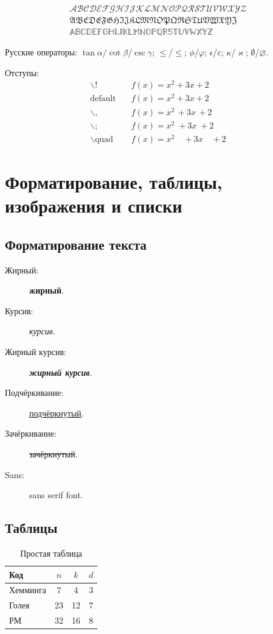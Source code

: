\documentclass[font=modern]{cmcmsuthesis-phd}
\begin{document}
\[\begin{aligned}\mathcal{ABCDEFGHIJKLMNOPQRSTUVWXYZ}\\\mathfrak{ABCDEFGHIJKLMNOPQRSTUVWXYZ}\\\mathbb{ABCDEFGHIJKLMNOPQRSTUVWXYZ}\end{aligned}\]

Русские операторы: $\tan\alpha$/$\cot\beta$/$\csc\gamma$; $\le$/$\leqslant$; $\phi$/$\varphi$; $\epsilon$/$\varepsilon$; $\kappa$/$\varkappa$; $\emptyset$/$\varnothing$.

Отступы:
\[\begin{aligned}\backslash!&\quad f(x)=x^2\!+3x\!+2\\\text{default}&\quad f(x)=x^2+3x+2\\\backslash,&\quad f(x)=x^2\,+3x\,+2\\\backslash;&\quad f(x)=x^2\;+3x\;+2\\\backslash\text{quad}&\quad f(x)=x^2\quad+3x\quad+2\end{aligned}\]

\chapter{Форматирование, таблицы, изображения и списки}

\section{Форматирование текста}
\begin{description}
\item[Жирный:] \textbf{жирный}.\item[Курсив:] \emph{курсив}.
\item[Жирный курсив:] \textbf{\emph{жирный курсив}}.
\item[Подчёркивание:] \underline{подчёркнутый}.
\item[Зачёркивание:] \sout{зачёркнутый}.
\item[Sans:] \textsf{sans serif font}.
\end{description}

\section{Таблицы}
\begin{table}[htbp]\caption{Простая таблица}\label{tab:simple}\centering
\begin{tabular}{|l|c|c|c|}\hline Код&$n$&$k$&$d$\\\hline
Хемминга&7&4&3\\\hline Голея&23&12&7\\\hline РМ&32&16&8\\\hline
\end{tabular}\end{table}
\end{document}

